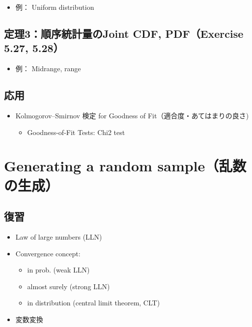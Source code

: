 \documentclass[
]{book}
\providecommand{\tightlist}{%
  \setlength{\itemsep}{0pt}\setlength{\parskip}{0pt}}
\begin{document}
\begin{itemize}
\tightlist
\item
  例： Uniform distribution
\end{itemize}

\section{定理3：順序統計量のJoint CDF, PDF（Exercise 5.27, 5.28）}\label{ux5b9aux74063ux9806ux5e8fux7d71ux8a08ux91cfux306ejoint-cdf-pdfexercise-5.27-5.28}

\begin{itemize}
\tightlist
\item
  例： Midrange, range
\end{itemize}

\section*{応用}\label{ux5fdcux7528-2}

\begin{itemize}
\item
  Kolmogorov--Smirnov 検定 for Goodness of Fit（適合度・あてはまりの良さ)

  \begin{itemize}
  \tightlist
  \item
    Goodness-of-Fit Tests: Chi2 test
  \end{itemize}
\end{itemize}

\chapter{Generating a random sample（乱数の生成）}\label{generating-a-random-sampleux4e71ux6570ux306eux751fux6210}

\section*{復習}\label{ux5fa9ux7fd2-3}

\begin{itemize}
\tightlist
\item
  Law of large numbers (LLN)
\item
  Convergence concept:

  \begin{itemize}
  \tightlist
  \item
    in prob. (weak LLN)
  \item
    almost surely (strong LLN)
  \item
    in distribution (central limit theorem, CLT)
  \end{itemize}
\item
  変数変換
\end{itemize}
\end{document}
